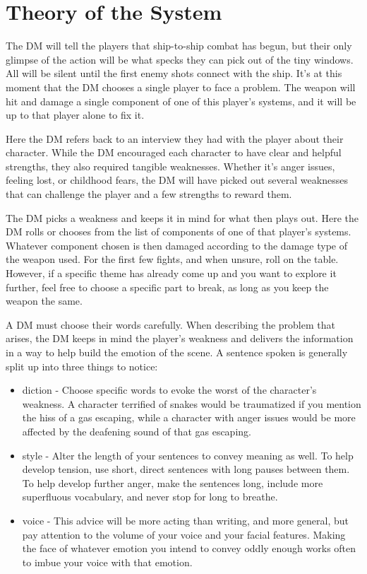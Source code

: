 \documentclass[a4paper]{article}
\begin{document}
\section{Theory of the System} \label{theory}

The DM will tell the players that ship-to-ship combat has begun, but their only glimpse of the action will be what specks they can pick out of the tiny windows. All will be silent until the first enemy shots connect with the ship. It's at this moment that the DM chooses a single player to face a problem. The weapon will hit and damage a single component of one of this player's systems, and it will be up to that player alone to fix it.

Here the DM refers back to an interview they had with the player about their character. While the DM encouraged each character to have clear and helpful strengths, they also required tangible weaknesses. Whether it's anger issues, feeling lost, or childhood fears, the DM will have picked out several weaknesses that can challenge the player and a few strengths to reward them.

The DM picks a weakness and keeps it in mind for what then plays out. Here the DM rolls or chooses from the list of components of one of that player's systems. Whatever component chosen is then damaged according to the damage type of the weapon used. For the first few fights, and when unsure, roll on the table. However, if a specific theme has already come up and you want to explore it further, feel free to choose a specific part to break, as long as you keep the weapon the same.

A DM must choose their words carefully. When describing the problem that arises, the DM keeps in mind the player's weakness and delivers the information in a way to help build the emotion of the scene. A sentence spoken is generally split up into three things to notice:
\begin{itemize}
\item diction - Choose specific words to evoke the worst of the character's weakness. A character terrified of snakes would be traumatized if you mention the hiss of a gas escaping, while a character with anger issues would be more affected by the deafening sound of that gas escaping.
\item style - Alter the length of your sentences to convey meaning as well. To help develop tension, use short, direct sentences with long pauses between them. To help develop further anger, make the sentences long, include more superfluous vocabulary, and never stop for long to breathe.
\item voice - This advice will be more acting than writing, and more general, but pay attention to the volume of your voice and your facial features. Making the face of whatever emotion you intend to convey oddly enough works often to imbue your voice with that emotion.
\end{itemize}
\end{document}
